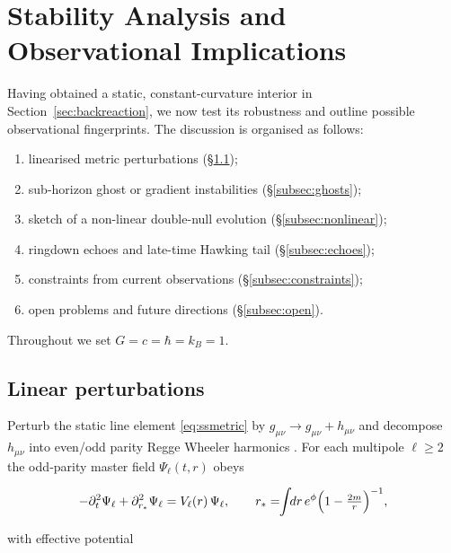 
\section{Stability Analysis and Observational Implications}
\label{sec:stability}

Having obtained a static, constant-curvature interior in
Section~\ref{sec:backreaction},
we now test its robustness and outline possible observational
fingerprints.  The discussion is organised as follows:

\begin{enumerate}[leftmargin=*,label=\textbf{\arabic*.}]
  \item linearised metric perturbations (\S\ref{subsec:linear});
  \item sub-horizon ghost or gradient instabilities (\S\ref{subsec:ghosts});
  \item sketch of a non-linear double-null evolution (\S\ref{subsec:nonlinear});
  \item ringdown echoes and late-time Hawking tail (\S\ref{subsec:echoes});
  \item constraints from current observations (\S\ref{subsec:constraints});
  \item open problems and future directions (\S\ref{subsec:open}).
\end{enumerate}
Throughout we set $G=c=\hbar=k_B=1$.

\subsection{Linear perturbations}
\label{subsec:linear}

Perturb the static line element \eqref{eq:ssmetric} by $g_{\mu\nu}\!\rightarrow\!g_{\mu\nu}+h_{\mu\nu}$ and decompose $h_{\mu\nu}$ into even/odd parity Regge Wheeler harmonics \cite{ReggeWheeler1957,Zerilli1970}. For each multipole $\ell\!\ge\!2$ the odd‐parity master field $\Psi_\ell(t,r)$ obeys

\begin{equation}
  -\partial_{t}^{2}\Psi_\ell
  +\partial_{r_*}^{2}\Psi_\ell
  =V_\ell(r)\,\Psi_\ell ,
  \qquad
  r_*=\!\!\int\!\!dr\,e^{\phi}\Bigl(1-\tfrac{2m}{r}\Bigr)^{-1},
  \label{eq:RW}
\end{equation}

with effective potential

